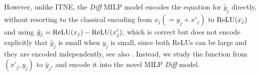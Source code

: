     However, unlike ITNE, 
	the {\em Diff} MILP model encodes the equation for $\hat{y}_j$ directly, without resorting to the classical encoding from $x_j(=y_j+x'_j)$ to 
	$\mathrm{ReLU}(x_j)$ and using $\hat{y}_j= \mathrm{ReLU}(x_j) - \mathrm{ReLU}(x'_j)$, which is correct but does not encode explicitly that $\hat{y}_j$ is small when $y_j$ is small, since both ReLUs can be large and they are encoded independently, see also \cite{diff}. Instead, we study the function from $(x'_j,y_j)$ to $\hat{y}_j$, and encode it into the novel MILP {\em Diff} model.
    


	
	

